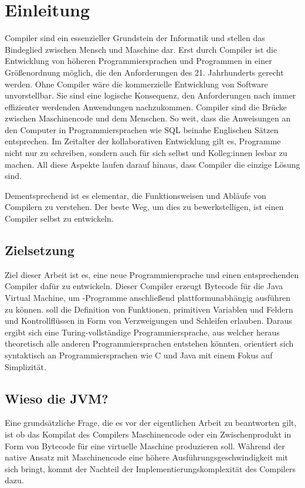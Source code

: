 \chapter{Einleitung}
\label{cha:Einleitung}

Compiler sind ein essenzieller Grundstein der Informatik und stellen das Bindeglied zwischen Mensch und Maschine dar. Erst durch Compiler ist die Entwicklung von höheren Programmiersprachen und Programmen in einer Größenordnung möglich, die den Anforderungen des 21. Jahrhunderts gerecht werden. Ohne Compiler wäre die kommerzielle Entwicklung von Software unvorstellbar. Sie sind eine logische Konsequenz, den Anforderungen nach immer effizienter werdenden Anwendungen nachzukommen. Compiler sind die Brücke zwischen Maschinencode und dem Menschen. So weit, dass die Anweisungen an den Computer in Programmiersprachen wie SQL beinahe Englischen Sätzen entsprechen. Im Zeitalter der kollaborativen Entwicklung gilt es, Programme nicht nur zu schreiben, sondern auch für sich selbst und Kolleg:innen lesbar zu machen. All diese Aspekte laufen darauf hinaus, dass Compiler die einzige Lösung sind.

Dementsprechend ist es elementar, die Funktionsweisen und Abläufe von Compilern zu verstehen. Der beste Weg, um dies zu bewerkstelligen, ist einen Compiler selbst zu entwickeln.

\section{Zielsetzung}

Ziel dieser Arbeit ist es, eine neue Programmiersprache und einen entsprechenden Compiler dafür zu entwickeln. Dieser Compiler erzeugt Bytecode für die Java Virtual Machine, um \toya-Programme anschließend plattformunabhängig ausführen zu können. \Toya soll die Definition von Funktionen, primitiven Variablen und Feldern und Kontrollflüssen in Form von Verzweigungen und Schleifen erlauben. Daraus ergibt sich eine Turing-vollständige Programmiersprache, aus welcher heraus theoretisch alle anderen Programmiersprachen entstehen könnten. \Toya orientiert sich syntaktisch an Programmiersprachen wie C und Java mit einem Fokus auf Simplizität.

\section{Wieso die JVM?}

Eine grundsätzliche Frage, die es vor der eigentlichen Arbeit zu beantworten gilt, ist ob das Kompilat des \toya Compilers Maschinencode oder ein Zwischenprodukt in Form von Bytecode für eine virtuelle Maschine produzieren soll. Während der native Ansatz mit Maschinencode eine höhere Ausführungsgeschwindigkeit mit sich bringt, kommt der Nachteil der Implementierungskomplexität des Compilers dazu.

